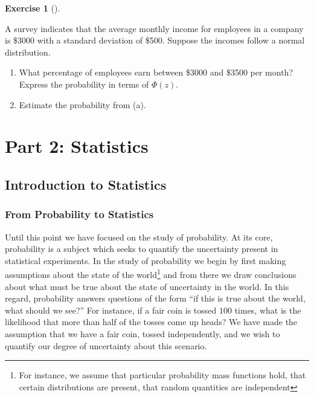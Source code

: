 \documentclass[
  letterpaper,
  DIV=11,
  numbers=noendperiod]{scrreprt}
\providecommand{\tightlist}{%
  \setlength{\itemsep}{0pt}\setlength{\parskip}{0pt}}\usepackage{longtable,booktabs,array}
\theoremstyle{definition}
\newtheorem{exercise}{Exercise}[chapter]
\theoremstyle{definition}
\theoremstyle{definition}
\theoremstyle{remark}
\begin{document}
\begin{exercise}[]\protect\hypertarget{exr-9.15}{}\label{exr-9.15}

A survey indicates that the average monthly income for employees in a
company is \$3000 with a standard deviation of \$500. Suppose the
incomes follow a normal distribution.

\begin{enumerate}
\def\labelenumi{\alph{enumi}.}
\tightlist
\item
  What percentage of employees earn between \$3000 and \$3500 per month?
  Express the probability in terms of \(\Phi(z)\).
\item
  Estimate the probability from (a).
\end{enumerate}

\end{exercise}

\part{Part 2: Statistics}

\chapter{Introduction to Statistics}\label{introduction-to-statistics}

\section{From Probability to
Statistics}\label{from-probability-to-statistics}

Until this point we have focused on the study of probability. At its
core, probability is a subject which seeks to quantify the uncertainty
present in statistical experiments. In the study of probability we begin
by first making assumptions about the state of the world\footnote{For
  instance, we assume that particular probability mass functions hold,
  that certain distributions are present, that random quantities are
  independent} and from there we draw conclusions about what must be
true about the state of uncertainty in the world. In this regard,
probability answers questions of the form ``if this is true about the
world, what should we see?'' For instance, if a fair coin is tossed
\(100\) times, what is the likelihood that more than half of the tosses
come up heads? We have made the assumption that we have a fair coin,
tossed independently, and we wish to quantify our degree of uncertainty
about this scenario.
\end{document}
